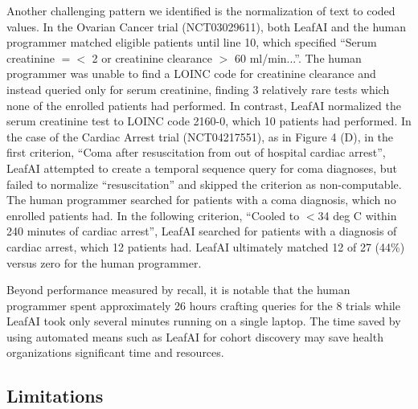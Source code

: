 \documentclass[../main.tex]{subfiles}
\begin{document}
Another challenging pattern we identified is the normalization of text to coded values. In the Ovarian Cancer trial (NCT03029611), both LeafAI and the human programmer matched eligible patients until line 10, which specified “Serum creatinine $=<$ 2 or creatinine clearance $>$ 60 ml/min...”. The human programmer was unable to find a LOINC code for creatinine clearance and instead queried only for serum creatinine, finding 3 relatively rare tests which none of the enrolled patients had performed. In contrast, LeafAI normalized the serum creatinine test to LOINC code 2160-0, which 10 patients had performed. In the case of the Cardiac Arrest trial (NCT04217551), as in Figure 4 (D), in the first criterion, “Coma after resuscitation from out of hospital cardiac arrest”, LeafAI attempted to create a temporal sequence query for coma diagnoses, but failed to normalize “resuscitation” and skipped the criterion as non-computable. The human programmer searched for patients with a coma diagnosis, which no enrolled patients had. In the following criterion, “Cooled to $<$34 deg C within 240 minutes of cardiac arrest”, LeafAI searched for patients with a diagnosis of cardiac arrest, which 12 patients had. LeafAI ultimately matched 12 of 27 (44\%) versus zero for the human programmer.  

Beyond performance measured by recall, it is notable that the human programmer spent approximately 26 hours crafting queries for the 8 trials while LeafAI took only several minutes running on a single laptop. The time saved by using automated means such as LeafAI for cohort discovery may save health organizations significant time and resources.

\subsection*{Limitations}
\end{document}
